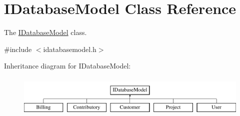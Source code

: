 \hypertarget{classIDatabaseModel}{\section{I\+Database\+Model Class Reference}
\label{classIDatabaseModel}
}


The \hyperlink{classIDatabaseModel}{I\+Database\+Model} class.  




{\ttfamily \#include $<$idatabasemodel.\+h$>$}

Inheritance diagram for I\+Database\+Model\+:\begin{figure}[H]
\begin{center}
\leavevmode
\includegraphics[height=2.000000cm]{d1/dc3/classIDatabaseModel}
\end{center}
\end{figure}
